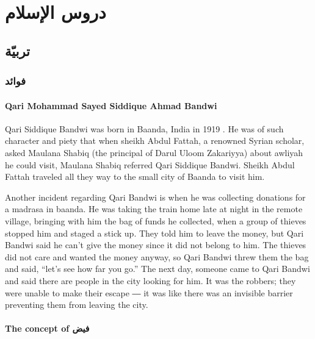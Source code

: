 \documentclass[
]{book}
\begin{document}
\hypertarget{part-ux62fux631ux648ux633-ux627ux644ux625ux633ux644ux627ux645}{%
\part{دروس الإسلام}\label{part-ux62fux631ux648ux633-ux627ux644ux625ux633ux644ux627ux645}}

\hypertarget{tarbiyya}{%
\chapter{تربيّة}\label{tarbiyya}}

\hypertarget{ux641ux648ux627ux626ux62f}{%
\section{فوائد}\label{ux641ux648ux627ux626ux62f}}

\hypertarget{qari-siddique}{%
\subsection{Qari Mohammad Sayed Siddique Ahmad Bandwi}\label{qari-siddique}}


Qari Siddique Bandwi was born in Baanda, India in 1919 \citep{bundelkhand}. He was of such character and piety that when sheikh Abdul Fattah, a renowned Syrian scholar, asked Maulana Shabiq (the principal of Darul Uloom Zakariyya) about awliyah he could visit, Maulana Shabiq referred Qari Siddique Bandwi. Sheikh Abdul Fattah traveled all they way to the small city of Baanda to visit him.

Another incident regarding Qari Bandwi is when he was collecting donations for a madrasa in baanda. He was taking the train home late at night in the remote village, bringing with him the bag of funds he collected, when a group of thieves stopped him and staged a stick up. They told him to leave the money, but Qari Bandwi said he can't give the money since it did not belong to him. The thieves did not care and wanted the money anyway, so Qari Bandwi threw them the bag and said, ``let's see how far you go.'' The next day, someone came to Qari Bandwi and said there are people in the city looking for him. It was the robbers; they were unable to make their escape ― it was like there was an invisible barrier preventing them from leaving the city.

\hypertarget{the-concept-of-ux641ux64aux636}{%
\subsection{The concept of فيض}\label{the-concept-of-ux641ux64aux636}}
\end{document}
